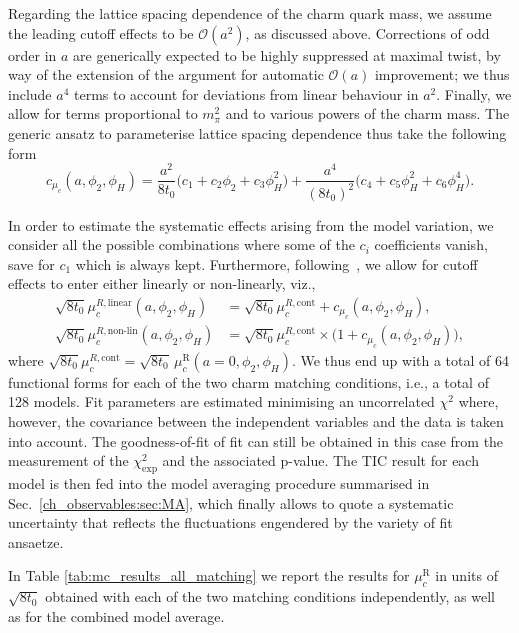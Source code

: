 Regarding the lattice spacing dependence of the charm quark mass, we assume the leading cutoff effects to 
be $\mathcal{O}(a^2)$, as discussed above. Corrections of odd order in $a$ are generically expected to be highly
suppressed at maximal twist, by way of the extension of the argument for automatic $\mathcal{O}(a)$
improvement; we thus include $a^4$ terms to account for deviations from linear behaviour
in $a^2$. Finally, we allow for terms proportional to $m_\pi^2$ and to various powers of the charm
mass. The generic ansatz to parameterise lattice spacing dependence thus take the following form
\begin{equation}
	c_{\mu_c}(a, \phi_2, \phi_H) = \frac{a^2}{8t_0} \big(
	c_1 + c_2\phi_2 + c_3 \phi_H^2
	\big)
	+
	\frac{a^4}{(8t_0)^2}\big(
	c_4 + c_5\phi_H^2 + c_6 \phi_H^4
	\big).
	\label{eq:lattice_spacing_dependence}
\end{equation} 

In order to estimate the systematic effects arising from the model variation, we consider all the possible 
combinations where some of the $c_i$ coefficients vanish, save for $c_1$ which is always kept.
Furthermore, following~\cite{Heitger:2021apz}, we allow for cutoff effects to enter either linearly or 
non-linearly, viz.,
  \begin{align} 	\label{eq:tot_model}
 	\sqrt{8t_0}\mu_c^{R,\text{linear}}(a, \phi_2,\phi_H) &=
 	\sqrt{8t_0}\mu_c^{R,\text{cont}} + c_{\mu_c}(a, \phi_2,\phi_H),
 	\\
 	\sqrt{8t_0}\mu_c^{R,\text{non-lin}}(a, \phi_2,\phi_H) &=
 	\sqrt{8t_0}\mu_c^{R,\text{cont}} \times\big(1+ c_{\mu_c}(a, \phi_2,\phi_H)\big), \nonumber
 \end{align}
where $\sqrt{8t_0}\mu_c^{R,\text{cont}}=\sqrt{8t_0}\, \mu_c^{\textrm{R}}(a=0, \phi_2, \phi_H)$. We thus end up with a total of 64 functional forms for each of the two charm matching conditions,
i.e., a total of 128 models.
Fit parameters are estimated minimising an uncorrelated
$\chi^2$ where, however, the covariance between the independent variables and the data is taken into account. The goodness-of-fit of fit can still be obtained in this case from the measurement of the $\chi^2_{\mathrm{exp}}$ and the associated p-value. The TIC result for each model is then fed into the model averaging procedure summarised in Sec.~\ref{ch_observables:sec:MA},
which finally allows to quote a systematic uncertainty that reflects the fluctuations
engendered by the variety of fit ansaetze.

In Table \ref{tab:mc_results_all_matching} we report the results for $\mu_c^{\textrm{R}}$
in units of $\sqrt{8t_0}$ obtained with each of the two matching conditions independently,
as well as for the combined model average.  

